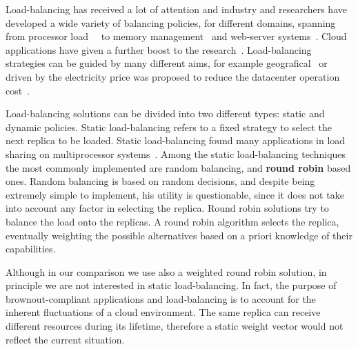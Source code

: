 Load-balancing has received a lot of attention and industry and
researchers have developed a wide variety of balancing policies, for
different domains, spanning from processor load~~\cite{Stankovic:TC}
to memory management~\cite{PattersonMemoryLB,MemoryLBACC} and
web-server systems~\cite{Cardellini2003}. Cloud applications have
given a further boost to the
research~\citep{Barroso09,Lu11:PerfEval,Lin12:IGCC}. Load-balancing
strategies can be guided by many different aims, for example
geografical~\cite{GeograficalSASO} or driven by the electricity price
was proposed to reduce the datacenter operation
cost~\cite{LoadBalancingForElectricity:TCC}.


Load-balancing solutions can be divided into two different types:
static and dynamic policies. Static load-balancing refers to a fixed
strategy to select the next replica to be loaded. Static
load-balancing found many applications in load sharing on
multiprocessor
systems~\cite{StaticLoadBalancing:TSE,StaticOptimal:ACM}. Among the
static load-balancing techniques the most commonly implemented are
random balancing, and \textbf{round robin} based ones. Random
balancing is based on random decisions, and despite being extremely
simple to implement, his utility is questionable, since it does not
take into account any factor in selecting the replica. Round robin
solutions try to balance the load onto the replicas. A round robin
algorithm selects the replica, eventually weighting the possible
alternatives based on a priori knowledge of their capabilities.

Although in our comparison we use also a weighted round robin
solution, in principle we are not interested in static
load-balancing. In fact, the purpose of brownout-compliant
applications and load-balancing is to account for the inherent
fluctuations of a cloud environment. The same replica can receive
different resources during its lifetime, therefore a static weight
vector would not reflect the current situation.


